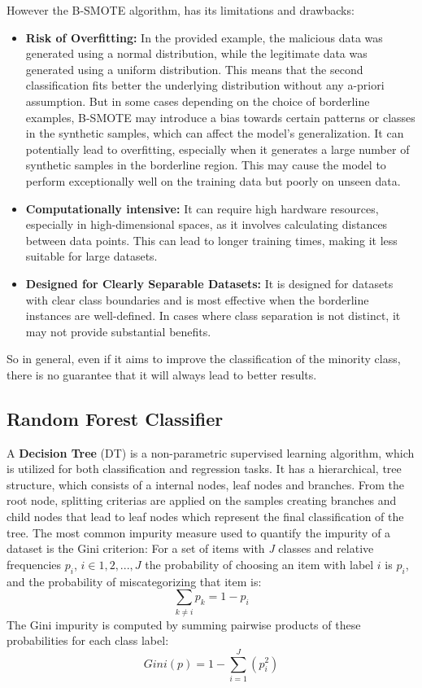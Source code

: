 However the B-SMOTE algorithm, has its limitations and drawbacks:
\begin{itemize}
  \item \textbf{Risk of Overfitting:} In the provided example, the malicious data was generated using a normal distribution, while the legitimate data was generated using a uniform distribution.
  This means that the second classification fits better the underlying distribution without any a-priori assumption.
  But in some cases depending on the choice of borderline examples, 
  B-SMOTE may introduce a bias towards certain patterns or classes in the synthetic samples, which can affect the model's generalization.
  It can potentially lead to overfitting, especially when it generates a large number of synthetic samples in the borderline region. 
  This may cause the model to perform exceptionally well on the training data but poorly on unseen data.
  \item \textbf{Computationally intensive:} It can require high hardware resources, especially in high-dimensional spaces, as it involves calculating distances between data points. 
  This can lead to longer training times, making it less suitable for large datasets.
  \item \textbf{Designed for Clearly Separable Datasets:} It is designed for datasets with clear class boundaries and is most effective when the borderline instances are well-defined. 
  In cases where class separation is not distinct, it may not provide substantial benefits.
\end{itemize}
So in general, even if it aims to improve the classification of the minority class, there is no guarantee that it will always lead to better results.

\subsection{Random Forest Classifier}
\label{subsec:RF}

A \textbf{Decision Tree} (DT) is a non-parametric supervised learning algorithm, which is utilized for both classification and regression tasks. 
It has a hierarchical, tree structure, which consists of a internal nodes, leaf nodes and branches.
From the root node, splitting criterias are applied on the samples creating branches and child nodes that lead to leaf nodes which represent the final classification of the tree.
The most common impurity measure used to quantify the impurity of a dataset is the Gini criterion:
For a set of items with \textit{J} classes and relative frequencies $p_{i}$, $i \in {1,2,...,J}$ 
the probability of choosing an item with label $i$ is $p_{i}$, and the probability of miscategorizing that item is:
\begin{equation} 
  \sum_{k \ne i} p_{k} = 1 - p_{i} 
\end{equation}
The Gini impurity is computed by summing pairwise products of these probabilities for each class label:
\begin{equation}
  Gini(p) = 1 - \sum_{i=1}^{J} (p_i^2)
\end{equation}

